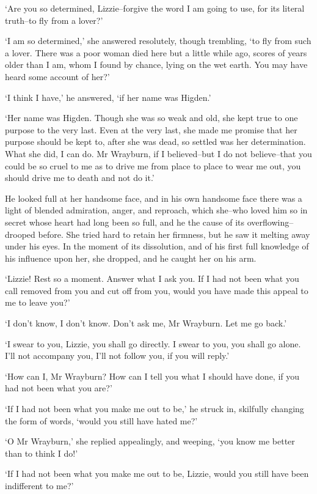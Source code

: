 ‘Are you so determined, Lizzie--forgive the word I am going to use, for
its literal truth--to fly from a lover?’

‘I am so determined,’ she answered resolutely, though trembling, ‘to fly
from such a lover. There was a poor woman died here but a little while
ago, scores of years older than I am, whom I found by chance, lying on
the wet earth. You may have heard some account of her?’

‘I think I have,’ he answered, ‘if her name was Higden.’

‘Her name was Higden. Though she was so weak and old, she kept true to
one purpose to the very last. Even at the very last, she made me promise
that her purpose should be kept to, after she was dead, so settled
was her determination. What she did, I can do. Mr Wrayburn, if I
believed--but I do not believe--that you could be so cruel to me as
to drive me from place to place to wear me out, you should drive me to
death and not do it.’

He looked full at her handsome face, and in his own handsome face there
was a light of blended admiration, anger, and reproach, which she--who
loved him so in secret whose heart had long been so full, and he the
cause of its overflowing--drooped before. She tried hard to retain her
firmness, but he saw it melting away under his eyes. In the moment of
its dissolution, and of his first full knowledge of his influence upon
her, she dropped, and he caught her on his arm.

‘Lizzie! Rest so a moment. Answer what I ask you. If I had not been what
you call removed from you and cut off from you, would you have made this
appeal to me to leave you?’

‘I don’t know, I don’t know. Don’t ask me, Mr Wrayburn. Let me go back.’

‘I swear to you, Lizzie, you shall go directly. I swear to you, you
shall go alone. I’ll not accompany you, I’ll not follow you, if you will
reply.’

‘How can I, Mr Wrayburn? How can I tell you what I should have done, if
you had not been what you are?’

‘If I had not been what you make me out to be,’ he struck in, skilfully
changing the form of words, ‘would you still have hated me?’

‘O Mr Wrayburn,’ she replied appealingly, and weeping, ‘you know me
better than to think I do!’

‘If I had not been what you make me out to be, Lizzie, would you still
have been indifferent to me?’

